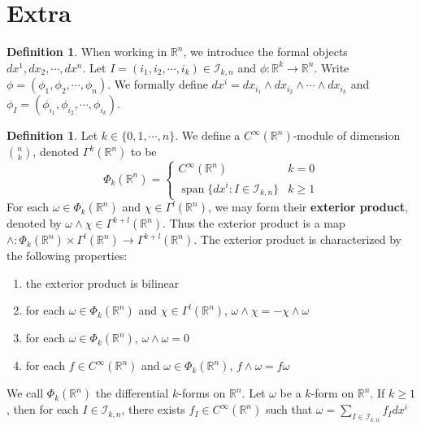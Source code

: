 \documentclass[12pt]{amsart}
\theoremstyle{definition}
\newtheorem{defn}[definition]{Definition}
\newcommand{\om}{\omega}
\newcommand{\R}{\mathbb{R}}
\newcommand{\MI}{\mathcal{I}}
\DeclareMathOperator{\spn}{span}
\begin{document}
	
	
	
	
	
	
	
	
	
	
	
	
	
	
	
	
	
	
	
	
	\newpage 
	\section{Extra}
	\begin{defn}
		When working in $\R^n$, we introduce the formal objects $dx^1, dx_2, \cdots, dx^n$. Let $I = (i_1, i_2, \cdots, i_k)\in \MI_{k,n}$ and $\phi: \R^k \rightarrow \R^n$. Write $\phi = (\phi_1, \phi_2, \cdots, \phi_n)$. We formally define $dx^i = dx_{i_1}\wedge dx_{i_2} \wedge \cdots \wedge dx_{i_k}$ and $\phi_I = (\phi_{i_1}, \phi_{i_2}, \cdots, \phi_{i_k})$.   
	\end{defn}
	
	\begin{defn}
		Let $k \in \{0, 1, \cdots, n\}$. We define a $C^{\infty}(\R^n)$-module of dimension ${n \choose k}$, denoted $\Gamma^k(\R^n)$ to be 
		\[
		\Phi_k(\R^n) =
		\begin{cases}
			C^{\infty}(\R^n) & k = 0 \\
			\spn \{ dx^i: I \in \MI_{k,n} \} & k \geq 1
		\end{cases}
		\]
		For each $\om \in \Phi_k(\R^n)$ and $\chi \in \Gamma^l(\R^n)$,   we may form their \textbf{exterior product}, denoted by $\om \wedge \chi \in \Gamma^{k+l}(\R^n)$. Thus the exterior product is a map $\wedge : \Phi_k(\R^n) \times \Gamma^l(\R^n)\rightarrow \Gamma^{k+l}(\R^n)$. The exterior product is characterized by the following properties:
		\begin{enumerate}
			\item the exterior product is bilinear
			\item for each $\om \in \Phi_k(\R^n)$ and $\chi \in \Gamma^l(\R^n)$, $\om \wedge \chi = - \chi \wedge \om$ 
			\item for each $\om \in \Phi_k(\R^n)$, $\om \wedge \om = 0$
			\item for each $f \in C^{\infty}(\R^n)$ and $ \om \in \Phi_k(\R^n)$, $f \wedge \om = f \om$
		\end{enumerate}
		We call $\Phi_k(\R^n)$ the differential $k$-forms on $\R^n$. Let $\om$ be a $k$-form on $\R^n$. If $k \geq 1$, then for each $I \in \MI_{k,n}$, there exists $f_I \in C^{\infty}(\R^n)$ such that $\om = \sum\limits_{I \in \MI_{k,n}} f_I dx^i$
	\end{defn}
	
\end{document}
